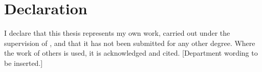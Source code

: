 \chapter*{Declaration}
I declare that this thesis represents my own work, carried out under the supervision of \supervisor, and that it has not been submitted for any other degree. Where the work of others is used, it is acknowledged and cited. [Department wording to be inserted.]

\vspace{2cm}
\noindent\authorname\\ \rollno
\clearpage
